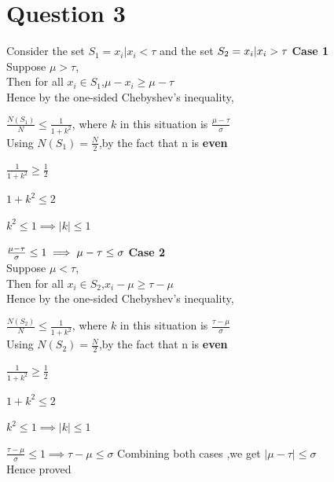 \documentclass{article}
\begin{document}
\newpage
\section*{Question 3}
    Consider the set $S_1={x_i|x_i<\tau}$ and the set $S_2={x_i|x_i>\tau}\\$
    \newline
    \textbf{Case 1}\\
    Suppose $\mu > \tau$,\\
    Then for all $x_i \in S_1$,$\mu-x_i \geq \mu-\tau$\\
    Hence by the one-sided Chebyshev's inequality,
    \par
    $\frac{N(S_1)}{N} \leq \frac{1}{1+k^2}$, where $k$ in this situation is $\frac{\mu-\tau}{\sigma}$\\
    \newline
    Using $N(S_1)=\frac{N}{2}$,by the fact that n is \textbf{even}
    \par 
    $\frac{1}{1+k^2} \geq \frac{1}{2}$
    \par 
    $1+k^2 \leq 2$
    \par
    $k^2 \leq 1 \implies |k| \leq 1$
    \par
    $\frac{\mu-\tau}{\sigma} \leq 1 \implies \mu-\tau \leq \sigma \\$
    \newline 
    \textbf{Case 2}\\
    Suppose $\mu < \tau$,\\
    Then for all $x_i \in S_2$,$x_i-\mu \geq \tau-\mu$\\
    Hence by the one-sided Chebyshev's inequality,
    \par
    $\frac{N(S_2)}{N} \leq \frac{1}{1+k^2}$, where $k$ in this situation is $\frac{\tau-\mu}{\sigma}$\\
    \newline
    Using $N(S_2)=\frac{N}{2}$,by the fact that n is \textbf{even}
    \par 
    $\frac{1}{1+k^2} \geq \frac{1}{2}$
    \par 
    $1+k^2 \leq 2$
    \par
    $k^2 \leq 1 \implies |k| \leq 1$
    \par
    $\frac{\tau-\mu}{\sigma} \leq 1 \implies \tau-\mu \leq \sigma$
    \newline
    \newline
    Combining both cases ,we get $|\mu-\tau| \leq \sigma$\\
    Hence proved
\end{document}
